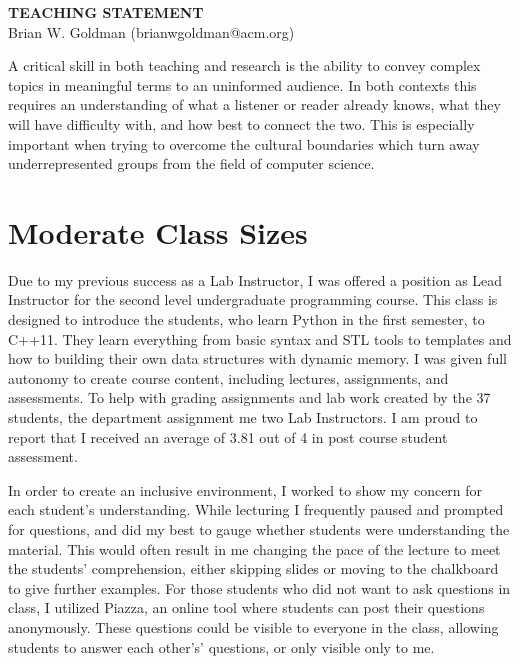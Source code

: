 \documentclass[a4paper, 11pt]{article}
\begin{document}
\thispagestyle{empty}

\pagestyle{fancy}

\begin{center}
{\LARGE \bf TEACHING STATEMENT}\\
\vspace*{0.1cm}
{\normalsize Brian W. Goldman (brianwgoldman@acm.org)}
\end{center}

\noindent
A critical skill in both teaching and research is the ability to convey
complex topics in meaningful terms to an uninformed audience. In both
contexts this requires an understanding of what a listener or reader
already knows, what they will have difficulty with, and how best to
connect the two. This is especially important when trying to overcome
the cultural boundaries which turn away underrepresented groups from
the field of computer science.

\section{Moderate Class Sizes}
Due to my previous success as a Lab Instructor, I was offered a
position as Lead Instructor for the second level undergraduate
programming course. This class is designed to introduce the students,
who learn Python in the first semester, to C++11. They learn
everything from basic syntax and STL tools to templates and how
to building their own data structures with dynamic memory.
I was given full autonomy to create course content, including
lectures, assignments, and assessments. To help with grading
assignments and lab work created by the 37 students, the
department assignment me two Lab Instructors.
I am proud to report that I received an average
of 3.81 out of 4 in post course student assessment.

In order to create an inclusive environment, I worked to
show my concern for each student’s understanding. While
lecturing I frequently paused and prompted for questions,
and did my best to gauge whether students were understanding
the material. This would often result in me changing the pace
of the lecture to meet the students’ comprehension, either
skipping slides or moving to the chalkboard to give further
examples. For those students who did not want to ask questions
in class, I utilized Piazza, an online tool where students
can post their questions anonymously. These questions could be
visible to everyone in the class, allowing students to answer
each other's’ questions, or only visible only to me. 
\end{document}
